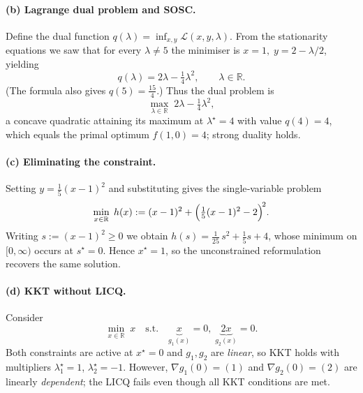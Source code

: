 \documentclass[11pt]{article}
\begin{document}
        \paragraph{(b) Lagrange dual problem and SOSC.}
        Define the dual function
        \(q(\lambda)=\inf_{x,y}\mathcal L(x,y,\lambda)\).
        From the stationarity equations we saw that for every \(\lambda\neq5\)
        the minimiser is \(x=1,\;y=2-\lambda/2\), yielding
        \[
        q(\lambda)=2\lambda-\tfrac14\lambda^{2},\qquad \lambda\in\mathbb R.
        \]
        (The formula also gives \(q(5)=\tfrac{15}{4}\).)
        Thus the dual problem is
        \[
        \max_{\lambda\in\mathbb R}\; 2\lambda-\tfrac14\lambda^{2},
        \]
        a concave quadratic attaining its maximum at \(\lambda^\star=4\)
        with value \(q(4)=4\), which equals the primal optimum \(f(1,0)=4\);
        strong duality holds.
        
        \paragraph{(c) Eliminating the constraint.}
        Setting \(y=\tfrac15(x-1)^2\) and substituting gives the single‑variable
        problem
        \[
        \min_{x\in\mathbb R}\;h(x):=(x-1)^2+\Bigl(\tfrac15(x-1)^2-2\Bigr)^{\!2}.
        \]
        Writing \(s:=(x-1)^2\ge 0\) we obtain
        \(h(s)=\frac{1}{25}\,s^{2}+\frac{1}{5}s+4\), whose minimum on \([0,\infty)\) occurs at
        \(s^\star=0\).  Hence \(x^\star=1\), so the unconstrained reformulation
        recovers the same solution.
        
        \paragraph{(d) KKT without LICQ.}
        Consider
        \[
        \min_{x\in\mathbb R}\;x
        \quad\text{s.t.}\quad 
        \underbrace{x}_{g_1(x)}=0,\;
        \underbrace{2x}_{g_2(x)}=0.
        \]
        Both constraints are active at \(x^\star=0\) and \(g_1,g_2\) are
        \emph{linear}, so KKT holds with multipliers \(\lambda_1^\star=1\),
        \(\lambda_2^\star=-1\).
        However, \(\nabla g_1(0)=(1)\) and \(\nabla g_2(0)=(2)\) are linearly
        \emph{dependent}; the LICQ fails even though all KKT conditions are met.

    
\end{document}
